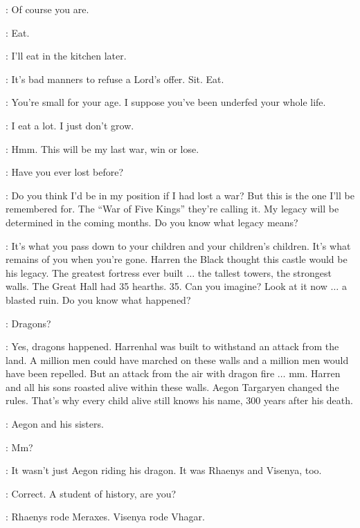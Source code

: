 \TYWIN: Of course you are.

\ARYA: Eat.

\TYWIN: I'll eat in the kitchen later.

\ARYA: It's bad manners to refuse a Lord's offer. Sit. Eat.


\TYWIN: You're small for your age. I suppose you've been underfed your whole life.

\ARYA: I eat a lot. I just don't grow.

\TYWIN: Hmm. This will be my last war, win or lose.


\ARYA: Have you ever lost before?

\TYWIN: Do you think I'd be in my position if I had lost a war? But this is the one I'll be remembered for. The ``War of Five Kings'' they're calling it. My legacy will be determined in the coming months. Do you know what legacy means?


\TYWIN: It's what you pass down to your children and your children's children. It's what remains of you when you're gone. Harren the Black thought this castle would be his legacy. The greatest fortress ever built $\ldots$ the tallest towers, the strongest walls. The Great Hall had 35 hearths. 35. Can you imagine? Look at it now $\ldots$ a blasted ruin. Do you know what happened?

\ARYA: Dragons?

\TYWIN: Yes, dragons happened. Harrenhal was built to withstand an attack from the land. A million men could have marched on these walls and a million men would have been repelled. But an attack from the air with dragon fire $\ldots$ mm. Harren and all his sons roasted alive within these walls. Aegon Targaryen changed the rules. That's why every child alive still knows his name, 300 years after his death.

\ARYA: Aegon and his sisters.

\TYWIN: Mm?

\ARYA: It wasn't just Aegon riding his dragon. It was Rhaenys and Visenya, too.

\TYWIN: Correct. A student of history, are you?

\ARYA: Rhaenys rode Meraxes. Visenya rode Vhagar.

